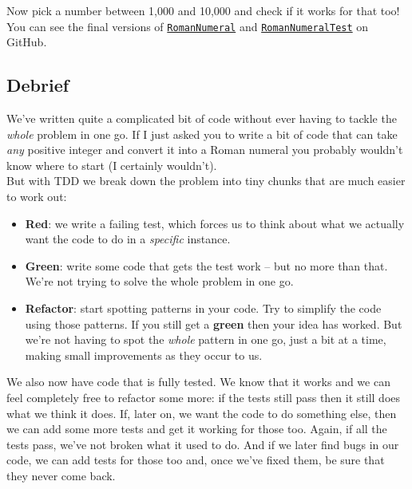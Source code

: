 \par\bigskip

Now pick a number between 1,000 and 10,000 and check if it works for that too!
\\

You can see the final versions of \href{https://github.com/develop-me/bootcamp--laravel-project/blob/develop/app/RomanNumeral.php}{\texttt{RomanNumeral}} and \href{https://github.com/develop-me/bootcamp--laravel-project/blob/develop/tests/Unit/RomanNumeralTest.php}{\texttt{RomanNumeralTest}} on GitHub.


\subsection{Debrief}

We've written quite a complicated bit of code without ever having to tackle the \textit{whole} problem in one go. If I just asked you to write a bit of code that can take \textit{any} positive integer and convert it into a Roman numeral you probably wouldn't know where to start (I certainly wouldn't).
\\

But with TDD we break down the problem into tiny chunks that are much easier to work out:

\begin{itemize}
    \item \textbf{Red}: we write a failing test, which forces us to think about what we actually want the code to do in a \textit{specific} instance.
    \item \textbf{Green}: write some code that gets the test work – but no more than that. We're not trying to solve the whole problem in one go.
    \item \textbf{Refactor}: start spotting patterns in your code. Try to simplify the code using those patterns. If you still get a \textbf{green} then your idea has worked. But we're not having to spot the \textit{whole} pattern in one go, just a bit at a time, making small improvements as they occur to us.
\end{itemize}

We also now have code that is fully tested. We know that it works and we can feel completely free to refactor some more: if the tests still pass then it still does what we think it does. If, later on, we want the code to do something else, then we can add some more tests and get it working for those too. Again, if all the tests pass, we've not broken what it used to do. And if we later find bugs in our code, we can add tests for those too and, once we've fixed them, be sure that they never come back.
\\

